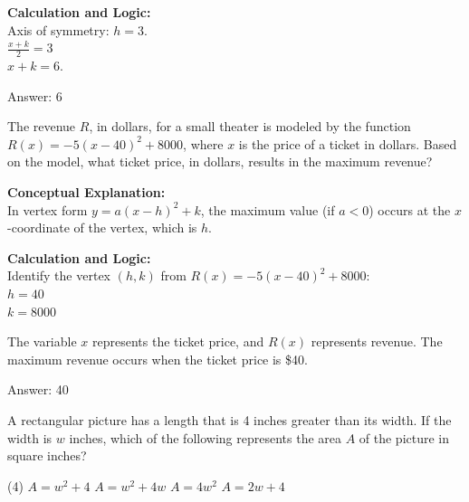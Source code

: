 \documentclass[11pt,paper=a4,answers]{exam}
\begin{document}
\begin{questions}
\begin{solution}
\vspace{20pt}

\textbf{Calculation and Logic:} \\
Axis of symmetry: $h = 3$. \\
$\frac{x + k}{2} = 3$ \\
$x + k = 6$.

\vspace{25pt}

Answer: \colorbox{yellow!100}{6}
\end{solution}


\question
The revenue $R$, in dollars, for a small theater is modeled by the function $R(x) = -5(x - 40)^2 + 8000$, where $x$ is the price of a ticket in dollars. Based on the model, what ticket price, in dollars, results in the maximum revenue?

\begin{solution}
\textbf{Conceptual Explanation:} \\
In vertex form $y = a(x-h)^2 + k$, the maximum value (if $a < 0$) occurs at the $x$-coordinate of the vertex, which is $h$.

\vspace{20pt}

\textbf{Calculation and Logic:} \\
Identify the vertex $(h, k)$ from $R(x) = -5(x - 40)^2 + 8000$: \\
$h = 40$ \\
$k = 8000$

\vspace{10pt}

The variable $x$ represents the ticket price, and $R(x)$ represents revenue. The maximum revenue occurs when the ticket price is \$40.

\vspace{25pt}

Answer: \colorbox{yellow!100}{40}
\end{solution}

\vspace{40pt}

\question
A rectangular picture has a length that is 4 inches greater than its width. If the width is $w$ inches, which of the following represents the area $A$ of the picture in square inches?
\begin{tasks}(4)
    \task $A = w^2 + 4$
    \task $A = w^2 + 4w$
    \task $A = 4w^2$
    \task $A = 2w + 4$
\end{tasks}


\end{questions}
\end{document}
